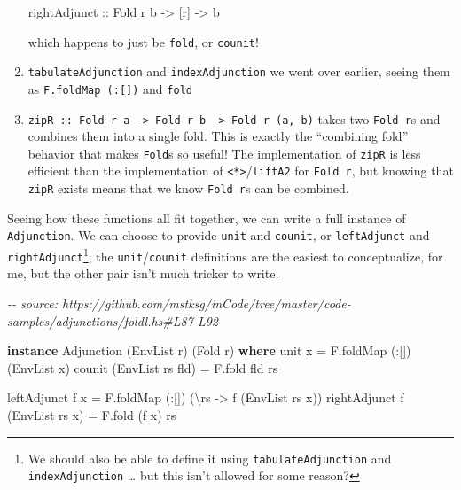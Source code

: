 \documentclass[]{article}
\newenvironment{Shaded}{}{}
\newcommand{\CommentTok}[1]{\textcolor[rgb]{0.38,0.63,0.69}{\textit{#1}}}
\newcommand{\DataTypeTok}[1]{\textcolor[rgb]{0.56,0.13,0.00}{#1}}
\newcommand{\KeywordTok}[1]{\textcolor[rgb]{0.00,0.44,0.13}{\textbf{#1}}}
\newcommand{\NormalTok}[1]{#1}
\newcommand{\OperatorTok}[1]{\textcolor[rgb]{0.40,0.40,0.40}{#1}}
\newcommand{\OtherTok}[1]{\textcolor[rgb]{0.00,0.44,0.13}{#1}}
\begin{document}
\begin{enumerate}
\begin{Shaded}
\begin{Highlighting}[]
\OtherTok{rightAdjunct\textquotesingle{} ::} \DataTypeTok{Fold}\NormalTok{ r b }\OtherTok{{-}>}\NormalTok{ [r] }\OtherTok{{-}>}\NormalTok{ b}
\end{Highlighting}
\end{Shaded}

  which happens to just be \texttt{fold}, or \texttt{counit}!
\item
  \texttt{tabulateAdjunction} and \texttt{indexAdjunction} we went over earlier,
  seeing them as \texttt{F.foldMap\ (:{[}{]})} and \texttt{fold}
\item
  \texttt{zipR\ ::\ Fold\ r\ a\ -\textgreater{}\ Fold\ r\ b\ -\textgreater{}\ Fold\ r\ (a,\ b)}
  takes two \texttt{Fold\ r}s and combines them into a single fold. This is
  exactly the ``combining fold'' behavior that makes \texttt{Fold}s so useful!
  The implementation of \texttt{zipR} is less efficient than the implementation
  of \texttt{\textless{}*\textgreater{}}/\texttt{liftA2} for \texttt{Fold\ r},
  but knowing that \texttt{zipR} exists means that we know \texttt{Fold\ r}s can
  be combined.
\end{enumerate}

Seeing how these functions all fit together, we can write a full instance of
\texttt{Adjunction}. We can choose to provide \texttt{unit} and \texttt{counit},
or \texttt{leftAdjunct} and \texttt{rightAdjunct}\footnote{We should also be
  able to define it using \texttt{tabulateAdjunction} and
  \texttt{indexAdjunction} \ldots{} but this isn't allowed for some reason?};
the \texttt{unit}/\texttt{counit} definitions are the easiest to conceptualize,
for me, but the other pair isn't much tricker to write.

\begin{Shaded}
\begin{Highlighting}[]
\CommentTok{{-}{-} source: https://github.com/mstksg/inCode/tree/master/code{-}samples/adjunctions/foldl.hs\#L87{-}L92}

\KeywordTok{instance} \DataTypeTok{Adjunction}\NormalTok{ (}\DataTypeTok{EnvList}\NormalTok{ r) (}\DataTypeTok{Fold}\NormalTok{ r) }\KeywordTok{where}
\NormalTok{    unit x }\OtherTok{=}\NormalTok{ F.foldMap (}\OperatorTok{:}\NormalTok{[]) (}\OtherTok{\textasciigrave{}EnvList\textasciigrave{}}\NormalTok{ x)}
\NormalTok{    counit (}\DataTypeTok{EnvList}\NormalTok{ rs fld) }\OtherTok{=}\NormalTok{ F.fold fld rs}

\NormalTok{    leftAdjunct f x }\OtherTok{=}\NormalTok{ F.foldMap (}\OperatorTok{:}\NormalTok{[]) (\textbackslash{}rs }\OtherTok{{-}>}\NormalTok{ f (}\DataTypeTok{EnvList}\NormalTok{ rs x))}
\NormalTok{    rightAdjunct f (}\DataTypeTok{EnvList}\NormalTok{ rs x) }\OtherTok{=}\NormalTok{ F.fold (f x) rs}
\end{Highlighting}
\end{Shaded}
\end{document}
